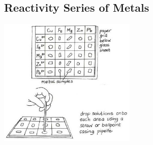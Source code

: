\begin{multicols}{2}
%
%

\subsection{Reactivity Series of Metals} 

\begin{center}
\includegraphics[width=0.49\textwidth]{./img/vso/reactivity-series.jpg}
\end{center}


\end{multicols}
